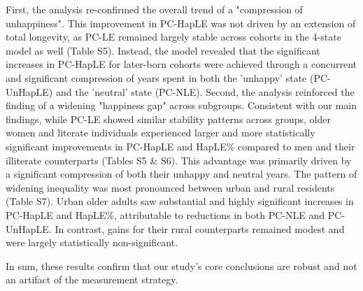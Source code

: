 \documentclass[12pt, a4paper]{article}
\begin{document}
First, the analysis re-confirmed the overall trend of a "compression of unhappiness". This improvement in PC-HapLE was not driven by an extension of total longevity, as PC-LE remained largely stable across cohorts in the 4-state model as well (Table S5). Instead, the model revealed that the significant increases in PC-HapLE for later-born cohorts were achieved through a concurrent and significant compression of years spent in both the 'unhappy' state (PC-UnHapLE) and the 'neutral' state (PC-NLE). Second, the analysis reinforced the finding of a widening "happiness gap" across subgroups. Consistent with our main findings, while PC-LE showed similar stability patterns across groups, older women and literate individuals experienced larger and more statistically significant improvements in PC-HapLE and HapLE\% compared to men and their illiterate counterparts (Tables S5 \& S6). This advantage was primarily driven by a significant compression of both their unhappy and neutral years. The pattern of widening inequality was most pronounced between urban and rural residents (Table S7). Urban older adults saw substantial and highly significant increases in PC-HapLE and HapLE\%, attributable to reductions in both PC-NLE and PC-UnHapLE. In contrast, gains for their rural counterparts remained modest and were largely statistically non-significant.

In sum, these results confirm that our study's core conclusions are robust and not an artifact of the measurement strategy.
\end{document}
